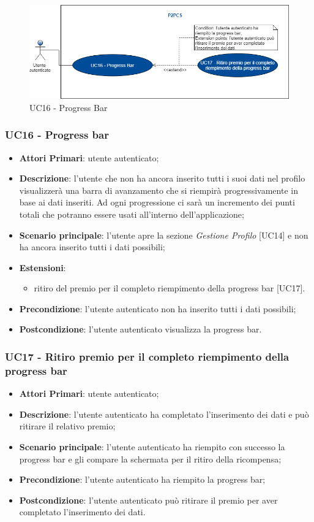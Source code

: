 \begin{figure}[h]
	\includegraphics[width=13cm]{res/images/Schemagenerale7.png}
	\centering
	\caption{UC16 - Progress Bar}
\end{figure}
\subsubsection{UC16 - Progress bar}
\begin{itemize}
	\item \textbf{Attori Primari}: utente autenticato;
	\item \textbf{Descrizione}: l'utente che non ha ancora inserito tutti i suoi dati nel profilo visualizzerà una barra di avanzamento che si riempirà progressivamente in base ai dati inseriti. Ad ogni progressione ci sarà un incremento dei punti totali che potranno essere usati all'interno dell'applicazione;
	\item \textbf{Scenario principale}: l'utente apre la sezione \textit{Gestione Profilo} [UC14] e non ha ancora inserito tutti i dati possibili;
	\item \textbf{Estensioni}:
	\begin{itemize}
		\item ritiro del premio per il completo riempimento della progress bar [UC17].
	\end{itemize}
	\item \textbf{Precondizione}: l'utente autenticato non ha inserito tutti i dati possibili;
	\item \textbf{Postcondizione}: l'utente autenticato visualizza la progress bar.
\end{itemize}

\subsubsection{UC17 - Ritiro premio per il completo riempimento della progress bar}
\begin{itemize}
	\item \textbf{Attori Primari}: utente autenticato;
	\item \textbf{Descrizione}: l'utente autenticato ha completato l'inserimento dei dati e può ritirare il relativo premio;	
	\item \textbf{Scenario principale}: l'utente autenticato ha riempito con successo la progress bar e gli compare la schermata per il ritiro della ricompensa;
	\item \textbf{Precondizione}: l'utente autenticato ha riempito la progress bar;
	\item \textbf{Postcondizione}: l'utente autenticato può ritirare il premio per aver completato l'inserimento dei dati.
\end{itemize}
